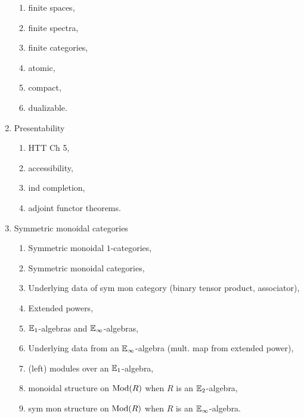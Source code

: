 \documentclass{amsart}
\begin{document}
\begin{enumerate}
\begin{enumerate}
  \item finite spaces,
  \item finite spectra,
  \item finite categories,
  \item atomic,
  \item compact,
  \item dualizable.
  \end{enumerate}
\item Presentability
  \begin{enumerate}
  \item HTT Ch 5,
  \item accessibility,
  \item ind completion,
  \item adjoint functor theorems.
  \end{enumerate}  
\item Symmetric monoidal categories
  \begin{enumerate}
  \item Symmetric monoidal $1$-categories,
  \item Symmetric monoidal categories,
  \item Underlying data of sym mon category (binary tensor product, associator),
  \item Extended powers,
  \item $\mathbb{E}_1$-algebras and $\mathbb{E}_\infty$-algebras,
  \item Underlying data from an $\mathbb{E}_\infty$-algebra (mult. map from extended power),
  \item (left) modules over an $\mathbb{E}_1$-algebra,
  \item monoidal structure on $\mathrm{Mod}(R)$ when $R$ is an $\mathbb{E}_2$-algebra,
  \item sym mon structure on $\mathrm{Mod}(R)$ when $R$ is an $\mathbb{E}_\infty$-algebra.
  \end{enumerate}
\end{enumerate}



\end{document}
